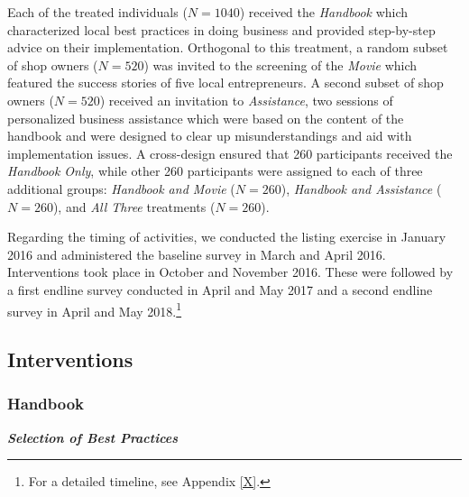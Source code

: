 \documentclass[11.5pt]{article}
\begin{document}
Each of the treated individuals ($N = 1040$) received the \emph{Handbook} which characterized local best practices in doing business and provided step-by-step advice on their implementation. Orthogonal to this treatment, a random subset of shop owners ($N = 520$) was invited to the screening of the \emph{Movie} which featured the success stories of five local entrepreneurs. A second subset of shop owners ($N = 520$) received an invitation to \emph{Assistance}, two sessions of personalized business assistance which were based on the content of the handbook and were designed to clear up misunderstandings and aid with implementation issues. A cross-design ensured that 260 participants received the \emph{Handbook Only}, while other 260 participants were assigned to each of three additional groups: \emph{Handbook and Movie} ($N = 260$), \emph{Handbook and Assistance} ($N = 260$), and \emph{All Three} treatments ($N = 260$).

Regarding the timing of activities, we conducted the listing exercise in January 2016 and administered the baseline survey in March and April 2016. Interventions took place in October and November 2016. These were followed by a first endline survey conducted in April and May 2017 and a second endline survey in April and May 2018.\footnote{For a detailed timeline, see Appendix \ref{X}.}

\subsection{Interventions}

\subsubsection{Handbook}

\emph{\textbf{Selection of Best Practices}}\
\end{document}
